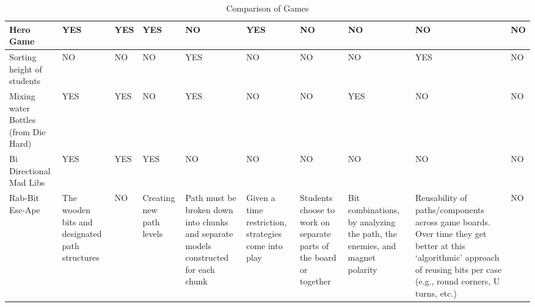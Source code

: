 \documentclass{acm_proc_article-sp}
\begin{document}
\begin{sidewaystable}[htbp]
\begin{tabular}{|p{2cm}||p{1.5cm}|p{2.5cm}|p{2.5cm}|p{2.7cm}|p{2cm}|p{1.5cm}|p{2cm}|p{4.2cm}|p{1.5cm}|}
    Hero Game 
      & \cellcolor{blue!25}YES 
      & \cellcolor{blue!25}YES 
      & \cellcolor{blue!25}YES 
      & NO 
      & \cellcolor{blue!25}YES 
      & NO 
      & NO 
      & NO 
      & NO \\ \hline
    
    Sorting height of students 
      & NO 
      & NO 
      & NO 
      & \cellcolor{blue!25}YES 
      & NO 
      & NO 
      & NO 
      & \cellcolor{blue!25}YES 
      & NO \\ \hline
        
    Mixing water Bottles (from Die Hard\cite{diehard2008thorp}) 
      & \cellcolor{blue!25}YES 
      & \cellcolor{blue!25}YES 
      & NO 
      & \cellcolor{blue!25}YES 
      & NO 
      & NO 
      & \cellcolor{blue!25}YES 
      & NO 
      & NO \\ \hline
    
    Bi Directional Mad Libs 
      & \cellcolor{blue!25}YES 
      & \cellcolor{blue!25}YES 
      & \cellcolor{blue!25}YES 
      & NO 
      & NO 
      & NO 
      & NO 
      & NO 
      & NO \\ \hline
    
    Rab-Bit Esc-Ape 
      & \cellcolor{blue!25}\raggedright{The wooden bits and designated path structures} 
      & NO 
      & \cellcolor{blue!25}\raggedright{Creating new path levels} 
      & \cellcolor{blue!25}\raggedright{Path must be broken down into chunks and separate models constructed for each chunk} 
      & \cellcolor{blue!25}\raggedright{Given a time restriction, strategies come into play} 
      & \cellcolor{blue!25}\raggedright{Students choose to work on separate parts of the board or together} 
      & \cellcolor{blue!25}\raggedright{Bit combinations, by analyzing the path, the enemies, and magnet polarity}
      & \cellcolor{blue!25}\raggedright{Reusability of paths/components across game boards.
        Over time they get better at this `algorithmic' approach of reusing bits per case (e.g., round corners, U turns, etc.)} 
      & NO \\ \hline

    \end{tabular}\hspace*{-1cm}\vspace*{-1cm}
    \vspace*{.6cm}\caption{Comparison of Games}
    \label{table:games-comparison}
\end{sidewaystable}

\clearpage
\end{document}

